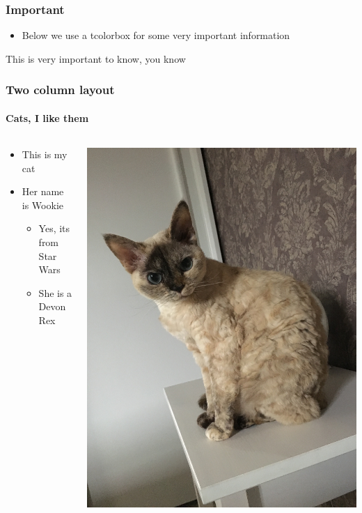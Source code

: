 \documentclass[aspectratio=169]{beamer}
\begin{document}
\begin{frame}
  \frametitle{Important}
  \begin{center}
    \begin{itemize}
      \item Below we use a tcolorbox for some very important information
    \end{itemize}
    \vfill
    \begin{tcolorbox}[colframe=eScienceBlue,title=Need to know]
       This is very important to know, you know
    \end{tcolorbox}
  \end{center}
\end{frame}

\begin{frame}
  \frametitle{Two column layout}
  \framesubtitle{Cats, I like them}
  \begin{columns}
    \begin{column}{0.5\textwidth}
      \begin{itemize}
        \item This is my cat
        \item Her name is Wookie
        \begin{itemize}
          \item Yes, its from Star Wars
          \item She is a Devon Rex
        \end{itemize}
      \end{itemize}
    \end{column}
    \begin{column}{0.5\textwidth}
      \includegraphics[height=0.75\textheight]{img/cat.jpg}

\end{column}
\end{columns}
\end{frame}
\end{document}
